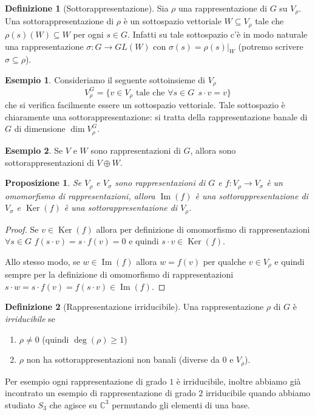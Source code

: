 \documentclass[11pt]{article}
\theoremstyle{plain}
\newtheorem{prop}[thm]{Proposizione}
\theoremstyle{definition}
\newtheorem{defn}{Definizione}[section]
\newtheorem{exmp}{Esempio}[section]
\theoremstyle{remark}
\newcommand{\C}{\mathbb{C}}
\DeclareMathOperator{\Ker}{Ker}
\DeclareMathOperator{\Imm}{Im}
\begin{document}
\begin{defn}[Sottorappresentazione]
Sia $\rho$ una rappresentazione di $G$ su $V_{\rho}$. Una sottorappresentazione di $\rho$ è un sottospazio vettoriale $W\subseteq V_{\rho}$ tale che $\rho(s)(W)\subseteq W$ per ogni $s\in G$. Infatti su tale sottospazio c'è in modo naturale una rappresentazione $\sigma:G\to GL(W)$ con $\sigma(s)=\rho(s)|_W$ (potremo scrivere $\sigma\subseteq \rho$).
\end{defn}

\begin{exmp}
Consideriamo il seguente sottoinsieme di $V_\rho$
\[V_{\rho}^G=\{v\in V_{\rho}\text{ tale che } \forall s\in G \ \ s\cdot v=v\}\]
che si verifica facilmente essere un sottospazio vettoriale. Tale sottospazio è chiaramente una sottorappresentazione:
si tratta della rappresentazione banale di $G$ di dimensione $\dim V_\rho^G$.
\end{exmp}

\begin{exmp}
Se $V$ e $W$ sono rappresentazioni di $G$, allora sono sottorappresentazioni di $V\oplus W$.
\end{exmp}

\begin{prop} Se $V_\rho$ e $V_\sigma$ sono rappresentazioni di $G$ e $f: V_\rho \to V_\sigma$ è un omomorfismo di rappresentazioni, allora $\Imm(f)$ è una sottorappresentazione di $V_\sigma$ e $\Ker(f)$ è una sottorappresentazione di $V_\rho$.
\end{prop}
\begin{proof}
Se $v\in \Ker(f)$ allora per definizione di omomorfismo di rappresentazioni $\forall s\in G$ $f(s\cdot v)=s\cdot f(v)=0$ e quindi $s\cdot v\in \Ker(f)$.
 
Allo stesso modo, se $w\in \Imm(f)$ allora $w=f(v)$ per qualche $v\in V_\rho$ e quindi sempre per la definizione di omomorfismo di rappresentazioni 
$s\cdot w=s\cdot f(v)=f(s\cdot v)\in \Imm(f)$.
\end{proof}

\begin{defn}[Rappresentazione irriducibile]
Una rappresentazione $\rho$ di $G$ è \textit{irriducibile} se
\begin{enumerate}
	\item $\rho \neq 0$ (quindi $\deg(\rho) \geq 1$)
	\item $\rho$ non ha sottorappresentazioni non banali (diverse da 0 e $V_{\rho}$).
\end{enumerate}
\end{defn}
Per esempio ogni rappresentazione di grado $1$ è irriducibile, inoltre abbiamo già incontrato
un esempio di rappresentazione di grado $2$ irriducibile quando abbiamo studiato $S_3$ che agisce su $\C^3$ permutando gli elementi di una base.
\end{document}
